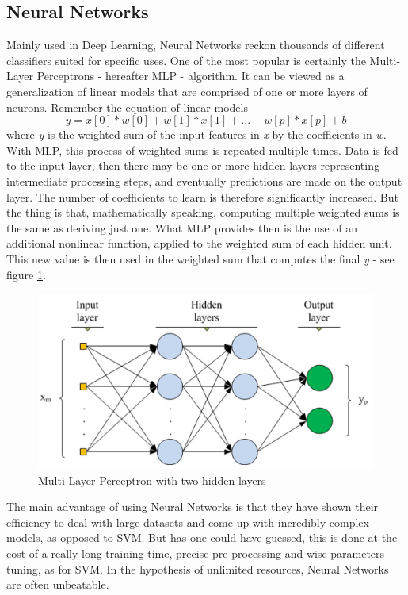 \subsection{Neural Networks}

Mainly used in Deep Learning, Neural Networks reckon thousands of different classifiers suited for specific uses. One of the most popular is certainly the Multi-Layer Perceptrons - hereafter MLP - algorithm. It can be viewed as a generalization of linear models that are comprised of one or more layers of neurons. Remember the equation of linear models
\[y = x[0] * w[0] + w[1] * x[1] + ... + w[p] * x[p] + b \]
where \textit{y} is the weighted sum of the input features in \textit{x} by the coefficients in \textit{w}. With MLP, this process of weighted sums is repeated multiple times. Data is fed to the input layer, then there may be one or more hidden layers representing intermediate processing steps, and eventually predictions are made on the output layer. The number of coefficients to learn is therefore significantly increased. But the thing is that, mathematically speaking, computing multiple weighted sums is the same as deriving just one. What MLP provides then is the use of an additional nonlinear function, applied to the weighted sum of each hidden unit. This new value is then used in the weighted sum that computes the final \textit{y} - see figure \ref{fig:MLP}.

\begin{figure}[!ht]
\centering
  \includegraphics[width=0.80\linewidth]{Figures/MLP.jpg}
  \caption{Multi-Layer Perceptron with two hidden layers \cite{mlp_source}}
  \label{fig:MLP}
\end{figure}

The main advantage of using Neural Networks is that they have shown their efficiency to deal with large datasets and come up with incredibly complex models, as opposed to SVM. But has one could have guessed, this is done at the cost of a really long training time, precise pre-processing and wise parameters tuning, as for SVM. In the hypothesis of unlimited resources, Neural Networks are often unbeatable.